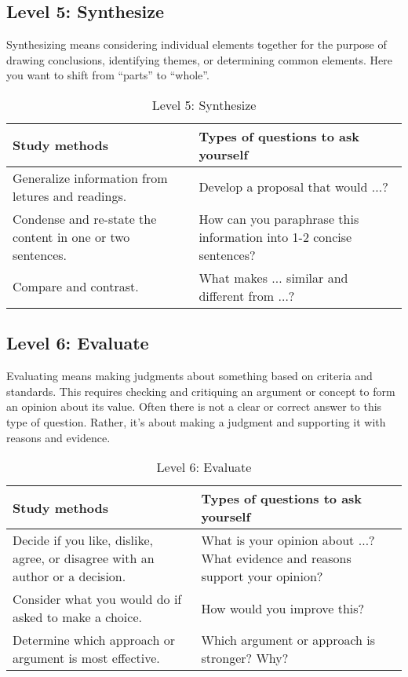 \documentclass[../main.tex]{subfiles}
\begin{document}
\subsection{Level 5: Synthesize}
Synthesizing means considering individual elements together for the purpose of
drawing conclusions, identifying themes, or determining common elements. Here
you want to shift from ``parts'' to ``whole''.
%
\begin{table}[H]
  \begin{center}
    \begin{tabular}[c]{p{6cm}p{6cm}}
      \hline
      Study methods & Types of questions to ask yourself \\
      \hline
      Generalize information from letures and readings. &	Develop a proposal
      that would $ \ldots $? \\
      Condense and re-state the content in one or two sentences. & How can you
      paraphrase this information into 1-2 concise sentences? \\
      Compare and contrast.	& What makes $ \ldots $ similar and different from $
      \ldots $? \\
      \hline
    \end{tabular}
    \caption{Level 5: Synthesize}
  \end{center}
\end{table}
%
\subsection{Level 6: Evaluate}
Evaluating means making judgments about something based on criteria and
standards. This requires checking and critiquing an argument or concept to form
an opinion about its value. Often there is not a clear or correct answer to this
type of question. Rather, it’s about making a judgment and supporting it with
reasons and evidence.
%
\begin{table}[H]
  \begin{center}
    \begin{tabular}[c]{p{6cm}p{6cm}}
      \hline
      Study methods & Types of questions to ask yourself \\
      \hline
      Decide if you like, dislike, agree, or disagree with an author or a
      decision. &	What is your opinion about $ \ldots $? What evidence and
      reasons support your opinion? \\
      Consider what you would do if asked to make a choice. &	How would you
      improve this? \\
      Determine which approach or argument is most effective. &	Which argument
      or approach is stronger? Why? \\
      \hline
    \end{tabular}
    \caption{Level 6: Evaluate}
  \end{center}
\end{table}
%
\end{document}
